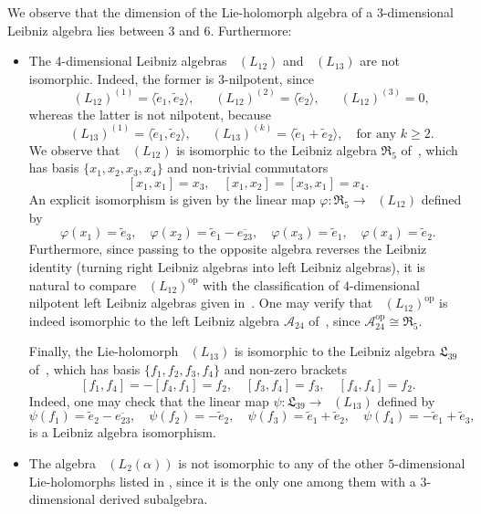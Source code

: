 \documentclass[11pt,a4paper]{amsart}
\theoremstyle{plain}
\theoremstyle{definition}
\theoremstyle{remark}
\numberwithin{equation}{section}
\newcommand{\0}{\emptyset}
\DeclareMathOperator{\op}{op}
\DeclareMathOperator{\holL}{hol_{Lie}}
\newcommand{\ov}[1]{\overline{#1}}
\begin{document}
We observe that the dimension of the Lie-holomorph algebra of a $3$-dimensional Leibniz algebra lies between $3$ and $6$. Furthermore:
\begin{itemize}[itemsep=0.35em]
	\item The $4$-dimensional Leibniz algebras $\holL(L_{12})$ and $\holL(L_{13})$ are not isomorphic. Indeed, the former is $3$-nilpotent, since
	      \[
	      	\holL(L_{12})^{(1)}=\langle \widetilde{e}_1,\widetilde{e}_2 \rangle, \quad \holL(L_{12})^{(2)}=\langle \widetilde{e}_2 \rangle, \quad \holL(L_{12})^{(3)}=0,
	      \]
	      whereas the latter is not nilpotent, because
	      \[
	      	\holL(L_{13})^{(1)}=\langle \widetilde{e}_1,\widetilde{e}_2 \rangle, \quad \holL(L_{13})^{(k)}=\langle \widetilde{e}_1+\widetilde{e}_2 \rangle, \quad \text{for any } k \geq 2.
	      \]
	      We observe that $\holL(L_{12})$ is isomorphic to the Leibniz algebra $\mathfrak{R}_5$ of~\cite[Theorem 3.2]{4-dim-nil}, which has basis $\lbrace x_1,x_2,x_3,x_4 \rbrace$ and non-trivial commutators
	      \[
	      	[x_1,x_1]=x_3, \quad [x_1,x_2]=[x_3,x_1]=x_4.
	      \]
	      An explicit isomorphism is given by the linear map $\varphi \colon \mathfrak{R}_5 \to \holL(L_{12})$ defined by
	      \[
	      	\varphi(x_1)=\widetilde{e}_3, \quad \varphi(x_2)=\widetilde{e}_1-\ov{e_{23}}, \quad \varphi(x_3)=\widetilde{e}_1, \quad \varphi(x_4)=\widetilde{e}_2.
	      \]
Furthermore, since passing to the opposite algebra reverses the Leibniz identity (turning right Leibniz algebras into left Leibniz algebras), it is natural to compare $\holL(L_{12})^{\op}$ with the classification of $4$-dimensional nilpotent left Leibniz algebras given in~\cite{4-dim-nil}. One may verify that $\holL(L_{12})^{\op}$ is indeed isomorphic to the left Leibniz algebra $\mathcal{A}_{24}$ of~\cite[Theorem 2.6]{4-dim-nil}, since $\mathcal{A}_{24}^{\op} \cong \mathfrak{R}_5$.
	      
Finally, the Lie-holomorph $\holL(L_{13})$ is isomorphic to the Leibniz algebra $\mathfrak{L}_{39}$ of~\cite[Proposition 3.11]{4-dim-solv}, which has basis $\lbrace f_1,f_2,f_3,f_4 \rbrace$ and non-zero brackets
	      \[
	      	[f_1,f_4]=-[f_4,f_1]=f_2, \quad [f_3,f_4]=f_3, \quad [f_4,f_4]=f_2.
	      \]
	      Indeed, one may check that the linear map $\psi \colon \mathfrak{L}_{39} \to \holL(L_{13})$ defined by
	      \[
	      	\psi(f_1)=\widetilde{e}_2-\ov{e_{23}}, \quad \psi(f_2)=-\widetilde{e}_2, \quad \psi(f_3)=\widetilde{e}_1+\widetilde{e}_2, \quad \psi(f_4)=-\widetilde{e}_1+\widetilde{e}_3,
	      \]
	      is a Leibniz algebra isomorphism.
	\item The algebra $\holL(L_2(\alpha))$ is not isomorphic to any of the other $5$-dimensional Lie-holomorphs listed in , since it is the only one among them with a $3$-dimensional derived subalgebra.
	      

\end{itemize}
\end{document}
